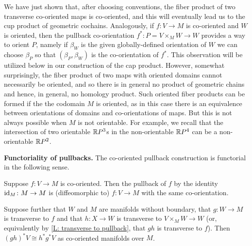\begin{remark}\label{R: what products exist}
	We have just shown that, after choosing conventions, the fiber product of two transverse co-oriented maps is co-oriented, and this will eventually lead us to the cup product of geometric cochains.
	Analogously, if $f \colon V \to M$ is co-oriented and $W$ is oriented, then the pullback co-orientation $f^* \colon P = V \times_M W \to W$ provides a way to orient $P$, namely if $\beta_W$ is the given globally-defined orientation of $W$ we can choose $\beta_P$ so that $(\beta_P, \beta_W)$ is the co-orientation of $f^*$.
	This observation will be utilized below in our construction of the cap product.
	However, somewhat surprisingly, the fiber product of two maps with oriented domains cannot necessarily be oriented, and so there is in general no product of geometric chains and hence, in general, no homology product.
	Such oriented fiber products can be formed if the the codomain $M$ is oriented, as in this case there is an equivalence between orientations of domains and co-orientations of maps.
	But this is not always possible when $M$ is not orientable.
	For example, we recall that the intersection of two orientable $\mathbb{R} P^3$s in the non-orientable $\mathbb{R} P^4$ can be a non-orientable $\mathbb{R} P^2$.
\end{remark}

\medskip\noindent\textbf{Functoriality of pullbacks.}
The co-oriented pullback construction is functorial in the following sense.

\begin{proposition}\label{P: pullback functoriality}
	Suppose $f \colon V \to M$ is co-oriented.
	Then the pullback of $f$ by the identity $\mathrm{id}_M \colon M \to M$ is (diffeomorphic to) $f \colon V \to M$ with the same co-orientation.

	Suppose further that $W$ and $M$ are manifolds without boundary, that $g \colon W \to M$ is transverse to $f$ and that $h \colon X \to W$ is transverse to $V \times_M W \to W$ (or, equivalently by \cref{L: transverse to pullback}, that $gh$ is transverse to $f$).
	Then $(gh)^*V \cong h^*g^*V$ as co-oriented manifolds over $M$.
\end{proposition}

